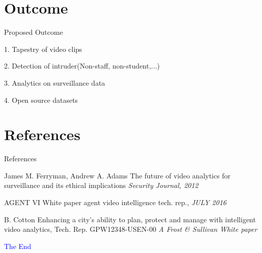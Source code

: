 \documentclass{beamer}
\begin{document}
\section{Outcome}
\begin{frame}{Proposed Outcome}
\begin{block}{1.}
Tapestry of video clips
\end{block}

\begin{block}{2.}
Detection of intruder(Non-staff, non-student,...)
\end{block}

\begin{block}{3.}
Analytics on surveillance data
\end{block}

\begin{block}{4.}
Open source datasets
\end{block}
\end{frame}


\section{References}
\begin{frame}{References}
  \footnotesize{
  \begin{thebibliography}{99}
     James  M. Ferryman, Andrew A. Adams
    \newblock The future of video analytics for surveillance and its ethical implications
    \newblock \emph{Security Journal, 2012}

     AGENT VI
    \newblock White paper agent video intelligence tech. rep.,
    \newblock \emph{JULY 2016}

     B. Cotton
    \newblock Enhancing a city’s ability to plan, protect and manage with intelligent video analytics, 				  Tech. Rep. 
    \newblock GPW12348-USEN-00 
    \newblock \emph{A Frost \& Sullivan White paper}
  \end{thebibliography}
  }
\end{frame}


\begin{frame}
\textcolor{blue}{\Huge{\centerline{The End}}}
\end{frame}

\end{document}
